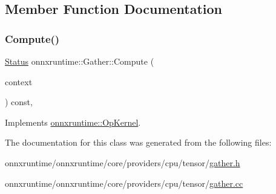 \subsection{Member Function Documentation}
\mbox{\label{classonnxruntime_1_1Gather_afd735d74b56aa994eccd98ee325aa4ba}} 
\subsubsection{\texorpdfstring{Compute()}{Compute()}}
{\footnotesize\ttfamily \mbox{\hyperlink{classonnxruntime_1_1common_1_1Status}{Status}} onnxruntime\+::\+Gather\+::\+Compute (\begin{DoxyParamCaption}\item[{\mbox{\hyperlink{classonnxruntime_1_1OpKernelContext}{Op\+Kernel\+Context}} $\ast$}]{context }\end{DoxyParamCaption}) const\hspace{0.3cm}{\ttfamily [override]}, {\ttfamily [virtual]}}



Implements \mbox{\hyperlink{classonnxruntime_1_1OpKernel_a9eca8656a78b1b3ab9d3351a12798650}{onnxruntime\+::\+Op\+Kernel}}.



The documentation for this class was generated from the following files\+:\begin{DoxyCompactItemize}
\item 
onnxruntime/onnxruntime/core/providers/cpu/tensor/\mbox{\hyperlink{cpu_2tensor_2gather_8h}{gather.\+h}}\item 
onnxruntime/onnxruntime/core/providers/cpu/tensor/\mbox{\hyperlink{cpu_2tensor_2gather_8cc}{gather.\+cc}}\end{DoxyCompactItemize}
